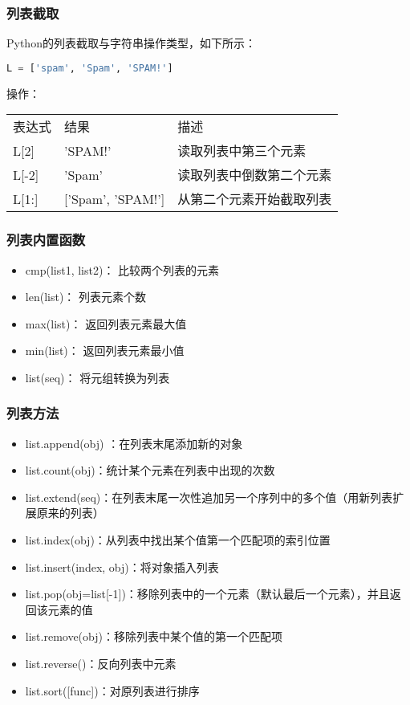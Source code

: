 \subsubsection{列表截取}
Python的列表截取与字符串操作类型，如下所示：
\begin{lstlisting}[language=Python]
L = ['spam', 'Spam', 'SPAM!']
\end{lstlisting}
操作：

\begin{tabular}{l|l|l}
表达式&	结果&	描述\\
L[2]&	'SPAM!'	&读取列表中第三个元素\\
L[-2]&	'Spam'	&读取列表中倒数第二个元素\\
L[1:]&	['Spam', 'SPAM!']&	从第二个元素开始截取列表
\end{tabular}


\subsubsection{列表内置函数}
\begin{itemize}
\item cmp(list1, list2)：
比较两个列表的元素
\item	len(list)：
列表元素个数
\item	max(list)：
返回列表元素最大值
\item	min(list)：
返回列表元素最小值
\item	list(seq)：
将元组转换为列表
\end{itemize}


\subsubsection{列表方法}
\begin{itemize}
\item list.append(obj) ：在列表末尾添加新的对象

\item list.count(obj)：统计某个元素在列表中出现的次数

\item list.extend(seq)：在列表末尾一次性追加另一个序列中的多个值（用新列表扩展原来的列表）

\item list.index(obj)：从列表中找出某个值第一个匹配项的索引位置

\item list.insert(index, obj)：将对象插入列表

\item list.pop(obj=list[-1])：移除列表中的一个元素（默认最后一个元素），并且返回该元素的值

\item list.remove(obj)：移除列表中某个值的第一个匹配项

\item list.reverse()：反向列表中元素

\item list.sort([func])：对原列表进行排序
\end{itemize}







